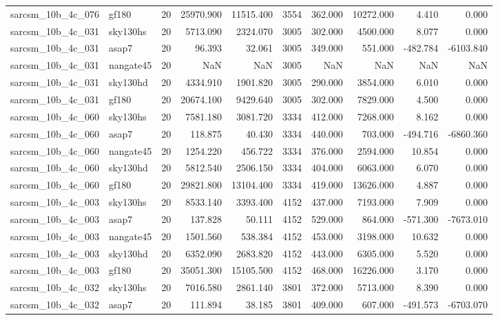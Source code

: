 \begin{longtable}{llrrrrrrrr}
sarcsm\_10b\_4c\_076 & gf180 & 20 & 25970.900 & 11515.400 & 3554 & 362.000 & 10272.000 & 4.410 & 0.000 \\
sarcsm\_10b\_4c\_031 & sky130hs & 20 & 5713.090 & 2324.070 & 3005 & 302.000 & 4500.000 & 8.077 & 0.000 \\
sarcsm\_10b\_4c\_031 & asap7 & 20 & 96.393 & 32.061 & 3005 & 349.000 & 551.000 & -482.784 & -6103.840 \\
sarcsm\_10b\_4c\_031 & nangate45 & 20 & NaN & NaN & 3005 & NaN & NaN & NaN & NaN \\
sarcsm\_10b\_4c\_031 & sky130hd & 20 & 4334.910 & 1901.820 & 3005 & 290.000 & 3854.000 & 6.010 & 0.000 \\
sarcsm\_10b\_4c\_031 & gf180 & 20 & 20674.100 & 9429.640 & 3005 & 302.000 & 7829.000 & 4.500 & 0.000 \\
sarcsm\_10b\_4c\_060 & sky130hs & 20 & 7581.180 & 3081.720 & 3334 & 412.000 & 7268.000 & 8.162 & 0.000 \\
sarcsm\_10b\_4c\_060 & asap7 & 20 & 118.875 & 40.430 & 3334 & 440.000 & 703.000 & -494.716 & -6860.360 \\
sarcsm\_10b\_4c\_060 & nangate45 & 20 & 1254.220 & 456.722 & 3334 & 376.000 & 2594.000 & 10.854 & 0.000 \\
sarcsm\_10b\_4c\_060 & sky130hd & 20 & 5812.540 & 2506.150 & 3334 & 404.000 & 6063.000 & 6.070 & 0.000 \\
sarcsm\_10b\_4c\_060 & gf180 & 20 & 29821.800 & 13104.400 & 3334 & 419.000 & 13626.000 & 4.887 & 0.000 \\
sarcsm\_10b\_4c\_003 & sky130hs & 20 & 8533.140 & 3393.400 & 4152 & 437.000 & 7193.000 & 7.909 & 0.000 \\
sarcsm\_10b\_4c\_003 & asap7 & 20 & 137.828 & 50.111 & 4152 & 529.000 & 864.000 & -571.300 & -7673.010 \\
sarcsm\_10b\_4c\_003 & nangate45 & 20 & 1501.560 & 538.384 & 4152 & 453.000 & 3198.000 & 10.632 & 0.000 \\
sarcsm\_10b\_4c\_003 & sky130hd & 20 & 6352.090 & 2683.820 & 4152 & 443.000 & 6305.000 & 5.520 & 0.000 \\
sarcsm\_10b\_4c\_003 & gf180 & 20 & 35051.300 & 15105.500 & 4152 & 468.000 & 16226.000 & 3.170 & 0.000 \\
sarcsm\_10b\_4c\_032 & sky130hs & 20 & 7016.580 & 2861.140 & 3801 & 372.000 & 5713.000 & 8.390 & 0.000 \\
sarcsm\_10b\_4c\_032 & asap7 & 20 & 111.894 & 38.185 & 3801 & 409.000 & 607.000 & -491.573 & -6703.070 \\

\end{longtable}
